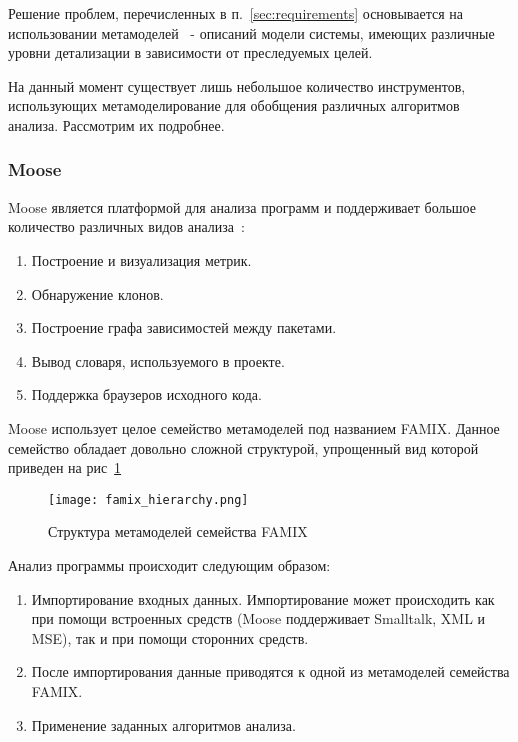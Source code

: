 Решение проблем, перечисленных в п.~\ref{sec:requirements} основывается на
использовании метамоделей~\cite{metamodeling} - описаний модели системы, имеющих
различные уровни детализации в зависимости от преследуемых целей.

На данный момент существует лишь небольшое количество инструментов, использующих
метамоделирование для обобщения различных алгоритмов анализа. Рассмотрим их
подробнее.

\subsubsection{Moose}

Moose является платформой для анализа программ и поддерживает большое количество
различных видов анализа~\cite{moose}:

\begin{enumerate}
    \item Построение и визуализация метрик.
    \item Обнаружение клонов.
    \item Построение графа зависимостей между пакетами.
    \item Вывод словаря, используемого в проекте.
    \item Поддержка браузеров исходного кода.
\end{enumerate}

Moose использует целое семейство метамоделей под названием FAMIX. Данное
семейство обладает довольно сложной структурой, упрощенный вид которой приведен
на рис~\ref{fig:famix_hierarchy}

\newpage
\begin{figure}[h!]
     \begin{center}
         \texttt{[image: famix\_hierarchy.png]}
     \end{center}
     \caption{Структура метамоделей семейства FAMIX}
     \label{fig:famix_hierarchy}
\end{figure}
\newpage

Анализ программы происходит следующим образом:

\begin{enumerate}
    \item Импортирование входных данных. Импортирование может происходить как
    при помощи встроенных средств (Moose поддерживает Smalltalk, XML и MSE),
    так и при помощи сторонних средств.
    \item После импортирования данные приводятся к одной из метамоделей
    семейства FAMIX.
    \item Применение заданных алгоритмов анализа.
\end{enumerate}

